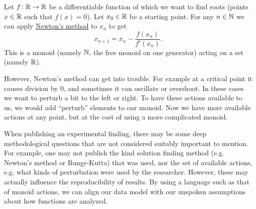 \documentclass[../main/CT4S-EN-RU]{subfiles}
\begin{document}
\begin{applicationENG}
Let $f\colon{\mathbb R}\rightarrow{\mathbb R}$ be a differentiable function of which we want to find roots (points $x\in{\mathbb R}$ such that $f(x)=0$). Let $x_0\in{\mathbb R}$ be a starting point. For any $n\in{\mathbb N}$ we can apply \href{http://en.wikipedia.org/wiki/Newton's_method}{\text Newton's method} to $x_n$ to get $$x_{n+1}=x_n-\frac{f(x_n)}{f'(x_n)}.$$
This is a monoid (namely ${\mathbb N},$ the free monoid on one generator) acting on a set (namely ${\mathbb R}$).

However, Newton's method can get into trouble. For example at a critical point it causes division by 0, and sometimes it can oscillate or overshoot. In these cases we want to perturb a bit to the left or right. To have these actions available to us, we would add “perturb” elements to our monoid. Now we have more available actions at any point, but at the cost of using a more complicated monoid.

When publishing an experimental finding, there may be some deep methodological questions that are not considered suitably important to mention. For example, one may not publish the kind solution finding method (e.g. Newton's method or Runge-Kutta) that was used, nor the set of available actions, e.g. what kinds of perturbation were used by the researcher. However, these may actually influence the reproducibility of results. By using a language such as that of monoid actions, we can align our data model with our unspoken assumptions about how functions are analyzed.
\end{applicationENG}
\end{document}
